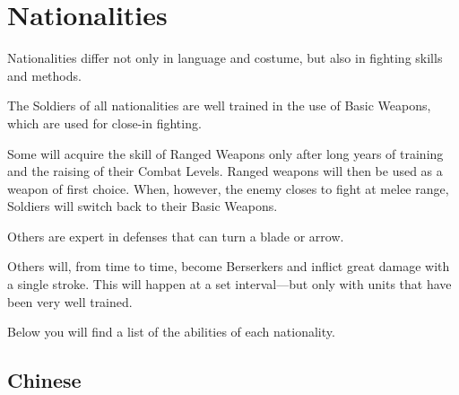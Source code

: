 

\chapter{Nationalities}

Nationalities differ not only in language and costume, but also in fighting skills and methods.

The Soldiers of all nationalities are well trained in the use of Basic Weapons, which are used for close-in fighting.

Some will acquire the skill of Ranged Weapons only after long years of training and the raising of their Combat Levels. Ranged weapons will then be used as a weapon of first choice. When, however, the enemy closes to fight at melee range, Soldiers will switch back to their Basic Weapons.

Others are expert in defenses that can turn a blade or arrow.

Others will, from time to time, become Berserkers and inflict great damage with a single stroke. This will happen at a set interval---but only with units that have been very well trained.

Below you will find a list of the abilities of each nationality.

\clearpage %

\section{Chinese}

